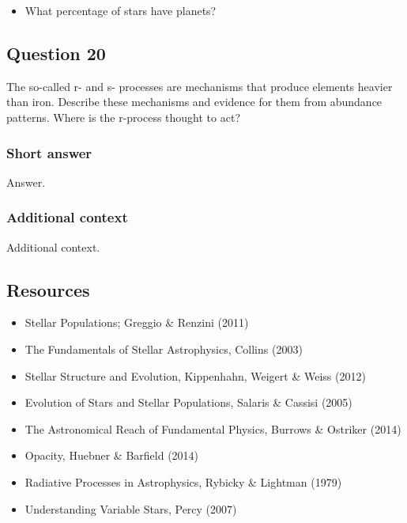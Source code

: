 \documentclass[a4paper,10pt]{article}
\begin{document}
\begin{itemize}
    \item What percentage of stars have planets?
\end{itemize}


\newpage
\subsection{Question 20}

The so-called r- and s- processes are mechanisms that produce elements heavier than iron. Describe these mechanisms and evidence for them from abundance patterns. Where is the r-process thought to act?

\subsubsection{Short answer}

Answer.

\subsubsection{Additional context}

Additional context.


\newpage
\subsection{Resources}

\begin{itemize}
    \item Stellar Populations; Greggio \& Renzini (2011)
    \item The Fundamentals of Stellar Astrophysics, Collins (2003)
    \item Stellar Structure and Evolution, Kippenhahn, Weigert \& Weiss (2012)
    \item Evolution of Stars and Stellar Populations, Salaris \& Cassisi (2005)
    \item The Astronomical Reach of Fundamental Physics, Burrows \& Ostriker (2014)
    \item Opacity, Huebner \& Barfield (2014)
    \item Radiative Processes in Astrophysics, Rybicky \& Lightman (1979)
    \item Understanding Variable Stars, Percy (2007)
\end{itemize}
\end{document}
